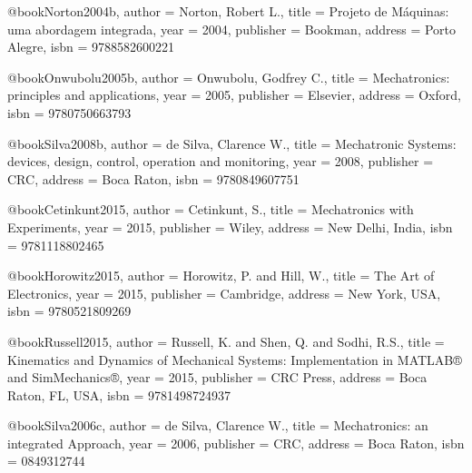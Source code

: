 @book{Norton2004b,
  author = {Norton, Robert L.},
  title = {Projeto de Máquinas: uma abordagem integrada},
  year = {2004},
  publisher = {Bookman},
  address = {Porto Alegre},
  isbn = {9788582600221}
}

@book{Onwubolu2005b,
  author = {Onwubolu, Godfrey C.},
  title = {Mechatronics: principles and applications},
  year = {2005},
  publisher = {Elsevier},
  address = {Oxford},
  isbn = {9780750663793}
}

@book{Silva2008b,
  author = {de Silva, Clarence W.},
  title = {Mechatronic Systems: devices, design, control, operation and monitoring},
  year = {2008},
  publisher = {CRC},
  address = {Boca Raton},
  isbn = {9780849607751}
}

%

@book{Cetinkunt2015,
  author = {Cetinkunt, S.},
  title = {Mechatronics with Experiments},
  year = {2015},
  publisher = {Wiley},
  address = {New Delhi, India},
  isbn = {9781118802465}
}

@book{Horowitz2015,
  author = {Horowitz, P. and Hill, W.},
  title = {The Art of Electronics},
  year = {2015},
  publisher = {Cambridge},
  address = {New York, USA},
  isbn = {9780521809269}
}

@book{Russell2015,
  author = {Russell, K. and Shen, Q. and Sodhi, R.S.},
  title = {Kinematics and Dynamics of Mechanical Systems: Implementation in MATLAB® and SimMechanics®},
  year = {2015},
  publisher = {CRC Press},
  address = {Boca Raton, FL, USA},
  isbn = {9781498724937}
}

@book{Silva2006c,
  author = {de Silva, Clarence W.},
  title = {Mechatronics: an integrated Approach},
  year = {2006},
  publisher = {CRC},
  address = {Boca Raton},
  isbn = {0849312744}
}

